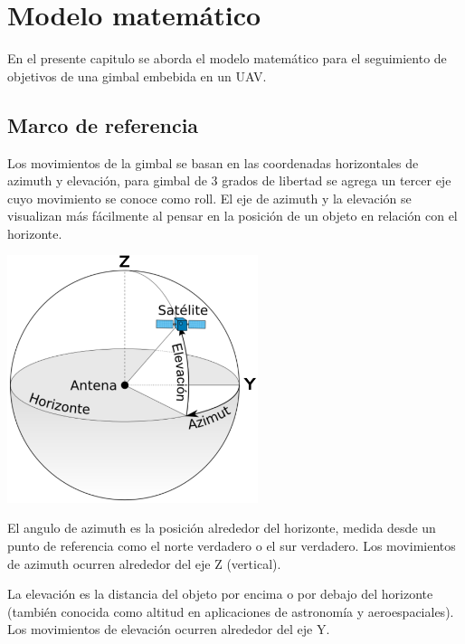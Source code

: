 \chapter{Modelo matemático}

En el presente capitulo se aborda el modelo matemático para el seguimiento de objetivos de una gimbal embebida en un UAV.

\section{Marco de referencia}
Los movimientos de la gimbal se basan en las coordenadas horizontales de azimuth y elevación, para gimbal de 3 grados de libertad
se agrega un tercer eje cuyo movimiento se conoce como roll. El eje de azimuth y la elevación se visualizan más fácilmente al
pensar en la posición de un objeto en relación con el horizonte.
\begin{center}
	\includegraphics[width=0.55\textwidth]{Contenido/Cuerpo/Capitulo3/Fig1.eps}
	\label{fig:ModeloMat:Fig1}
\end{center}
El angulo de azimuth es la posición alrededor del horizonte, medida desde un punto de referencia como el norte verdadero o el sur
verdadero. Los movimientos de azimuth ocurren alrededor del eje Z (vertical).

La elevación es la distancia del objeto por encima o por debajo del horizonte (también conocida como altitud en aplicaciones de
astronomía y aeroespaciales). Los movimientos de elevación ocurren alrededor del eje Y.

